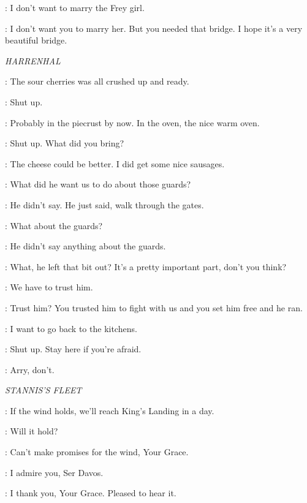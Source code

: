 \ROBB: I don't want to marry the Frey girl. 

\TALISA: I don't want you to marry her. But you needed that bridge. I hope it's a very beautiful bridge. 


\scene

\textit{HARRENHAL} 


\HOTPIE: The sour cherries was all crushed up and ready. 

\GENDRY: Shut up. 

\HOTPIE: Probably in the piecrust by now. In the oven, the nice warm oven. 

\ARYA: Shut up. What did you bring? 

\HOTPIE: The cheese could be better. I did get some nice sausages. 

\GENDRY: What did he want us to do about those guards? 

\ARYA: He didn't say. He just said, walk through the gates. 

\GENDRY: What about the guards? 

\ARYA: He didn't say anything about the guards. 

\GENDRY: What, he left that bit out? It's a pretty important part, don't you think? 

\ARYA: We have to trust him. 

\GENDRY: Trust him? You trusted him to fight with us and you set him free and he ran. 

\HOTPIE: I want to go back to the kitchens. 

\ARYA: Shut up. Stay here if you're afraid. 

\HOTPIE: Arry, don't. 


\scene

\textit{STANNIS'S FLEET} 


\DAVOS: If the wind holds, we'll reach King's Landing in a day. 

\STANNIS: Will it hold? 

\DAVOS: Can't make promises for the wind, Your Grace. 

\STANNIS: I admire you, Ser Davos. 

\DAVOS: I thank you, Your Grace. Pleased to hear it. 

